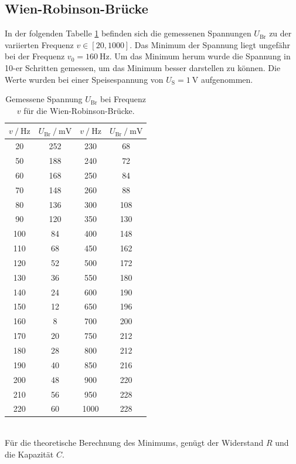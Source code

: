 \subsection{Wien-Robinson-Brücke}
In der folgenden Tabelle \ref{tab:e} befinden sich die gemessenen Spannungen $U_\text{Br}$ zu der variierten Frequenz $v \in \left [20, 1000\right ]$.
Das Minimum der Spannung liegt ungefähr bei der Frequenz $v_0 = \SI{160}{\hertz}$. Um das Minimum herum wurde die Spannung in 10-er 
Schritten gemessen, um das Minimum besser darstellen zu können. Die Werte wurden bei einer Speisespannung von $U_\text{S}=\SI{1}{\volt}$ aufgenommen.
\begin{table}
  \centering
  \begin{tabular}{cc|cc}
    \toprule
    {$v\:/\: \si{\hertz}$} & {$U_\text{Br} \:/\: \si{\milli\volt}$} & {$v\:/\: \si{\hertz}$} & {$U_\text{Br} \:/\: \si{\milli\volt}$} \\
    \midrule
    20 & 252 & 230 & 68 \\
    50 & 188 & 240 & 72 \\
    60 & 168 & 250 & 84 \\
    70 & 148 & 260 & 88 \\
    80 & 136 & 300 & 108 \\
    90 & 120 & 350 & 130 \\
    100 & 84 & 400 & 148 \\
    110 & 68 & 450 & 162 \\
    120 & 52 & 500 & 172 \\
    130 & 36 & 550 & 180 \\
    140 & 24 & 600 & 190 \\
    150 & 12 & 650 & 196 \\
    160 & 8  & 700 & 200 \\
    170 & 20 & 750 & 212 \\
    180 & 28 & 800 & 212 \\
    190 & 40 & 850 & 216 \\
    200 & 48 & 900 & 220 \\
    210 & 56 & 950 & 228 \\
    220 & 60 & 1000 & 228 \\
    \bottomrule
  \end{tabular}
  \caption{Gemessene Spannung $U_\text{Br}$ bei Frequenz $v$ für die Wien-Robinson-Brücke.}
  \label{tab:e}
\end{table}
\\
Für die theoretische Berechnung des Minimums, genügt der Widerstand $R$ und die Kapazität $C$.
